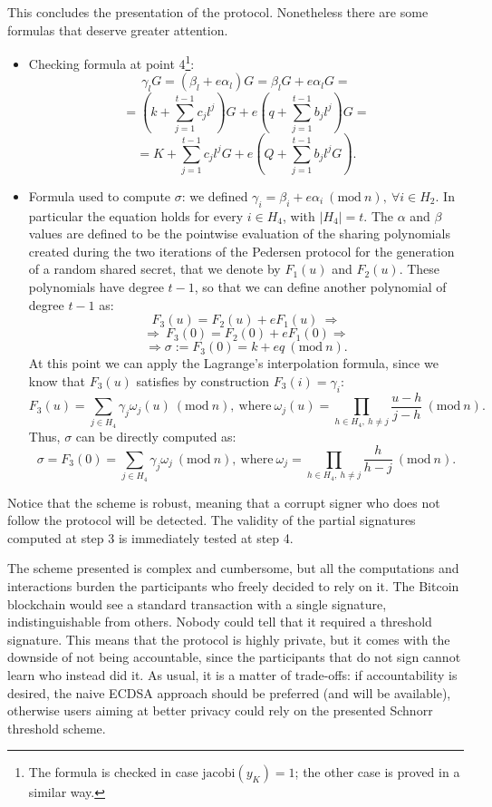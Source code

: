 This concludes the presentation of the protocol. Nonetheless there are some formulas that deserve greater attention.
\begin{itemize}
	\item Checking formula at point 4\footnote{The formula is checked in case $\text{jacobi}(y_K) = 1$; the other case is proved in a similar way.}: 
	$$\gamma_lG = (\beta_l + e\alpha_l)G = \beta_lG + e\alpha_lG = $$
	$$= \left(k + \sum_{j = 1}^{t - 1}c_jl^j\right)G + e\left(q + \sum_{j = 1}^{t - 1}b_jl^j\right)G =$$
	$$= K + \sum_{j = 1}^{t - 1}c_jl^jG + e\left(Q + \sum_{j = 1}^{t - 1}b_jl^jG\right).$$
	\item Formula used to compute $\sigma$: we defined $\gamma_i = \beta_i + e\alpha_i \ (\text{mod} \ n), \ \forall i \in H_2$. In particular the equation holds for every $i \in H_4$, with $|H_4| = t$. The $\alpha$ and $\beta$ values are defined to be the pointwise evaluation of the sharing polynomials created during the two iterations of the Pedersen protocol for the generation of a random shared secret, that we denote by $F_1(u)$ and $F_2(u)$. These polynomials have degree $t - 1$, so that we can define another polynomial of degree $t - 1$ as:
	$$F_3(u) = F_2(u) + eF_1(u) \ \Longrightarrow $$
	$$\Longrightarrow \ F_3(0) = F_2(0) + eF_1(0) \Longrightarrow $$
	$$\Longrightarrow \sigma := F_3(0) = k + eq \ (\text{mod} \ n).$$
	At this point we can apply the Lagrange's interpolation formula, since we know that $F_3(u)$ satisfies by construction $F_3(i) = \gamma_i$:
	$$F_3(u) = \sum_{j \in H_4}\gamma_j\omega_j(u) \ (\text{mod} \ n), \ \text{where} \ \omega_j(u) = \prod_{h \in H_4, \ h \neq j}\frac{u - h}{j -h} \ (\text{mod} \ n).$$
	Thus, $\sigma$ can be directly computed as:
	$$\sigma = F_3(0) = \sum_{j \in H_4}\gamma_j\omega_j \ (\text{mod} \ n), \ \text{where} \ \omega_j = \prod_{h \in H_4, \ h \neq j}\frac{h}{h - j} \ (\text{mod} \ n).$$
\end{itemize}
Notice that the scheme is robust, meaning that a corrupt signer who does not follow the protocol will be detected. The validity of the partial signatures computed at step 3 is immediately tested at step 4.

\bigskip

\bigskip
\noindent
The scheme presented is complex and cumbersome, but all the computations and interactions burden the participants who freely decided to rely on it. The Bitcoin blockchain would see a standard transaction with a single signature, indistinguishable from others. Nobody could tell that it required a threshold signature. This means that the protocol is highly private, but it comes with the downside of not being accountable, since the participants that do not sign cannot learn who instead did it. As usual, it is a matter of trade-offs: if accountability is desired, the naive ECDSA approach should be preferred (and will be available), otherwise users aiming at better privacy could rely on the presented Schnorr threshold scheme.

